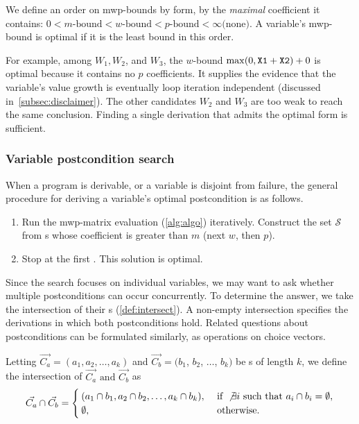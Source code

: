 \begin{definition}[Optimality]
    We define an order on mwp-bounds by form, by the \emph{maximal} coefficient it contains:
    \(0 < m\text{-bound} < w\text{-bound} < p\text{-bound} < \infty \text{(none)}\).
    A variable's mwp-bound is optimal if it is the least bound in this order.
\end{definition}

\noindent For example, among \( W_1, W_2\), and \(W_3\),
the \(w\)-bound \(\max(0,\prm{X1}+\prm{X2})+0\) is optimal because it contains no \(p\) coefficients.
It supplies the evidence that the variable's value growth is eventually loop iteration independent (discussed in~\autoref{subsec:disclaimer}).
The other candidates \( W_2\) and \(W_3\) are too weak to reach the same conclusion.
Finding a single derivation that admits the optimal form is sufficient.

\subsubsection{Variable postcondition search}
\label{subsec:pc-search}

When a program is derivable, or a variable is disjoint from failure,
the general procedure for deriving a variable's optimal postcondition is as follows.

\begin{enumerate}
    \item Run the mwp-matrix evaluation (\autoref{alg:algo}) iteratively.
    Construct the set \(\mathcal{S}\) from s whose coefficient is greater than \(m\) (next \(w\), then \(p\)).
    \item Stop at the first .
    This solution is optimal.
\end{enumerate}

\noindent
Since the search focuses on individual variables, we may want to ask whether multiple postconditions can occur concurrently.
To determine the answer, we take the intersection of their s (\autoref{def:intersect}).
A non-empty intersection specifies the derivations in which both postconditions hold.
Related questions about postconditions can be formulated similarly, as operations on choice vectors.

\begin{definition}\label{def:intersect}
Letting \(\vec{C_a} = (a_1, a_2,\dots,a_k) \) and \(\vec{C_b} = (b_1\), \(b_2\), \(\dots\), \(b_k)\) be s of length \(k\),
we define the intersection of \(\vec{C_a} \text{ and } \vec{C_b} \) as
\[ \vec{C_a} \cap \vec{C_b} = \begin{cases}
(a_1 \cap b_1, a_2 \cap b_2, \dots, a_k \cap b_k), & \text{ if } \not\exists i \text{ such that } a_i \cap b_i = \emptyset, \\
\emptyset, & \text{ otherwise.}\end{cases}
\]%
\end{definition}

